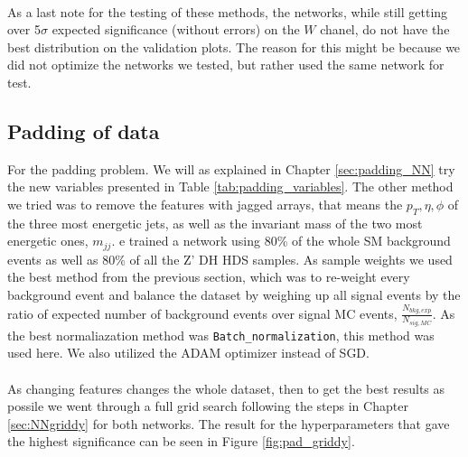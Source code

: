 \documentclass[12pt, a4paper]{book}
\begin{document}
\\As a last note for the testing of these methods, the networks, while still getting over 5$\sigma$ expected significance (without errors) on the $W$ chanel, do not have the best distribution on the validation plots. The reason for this might be because 
we did not optimize the networks we tested, but rather used the same network for test. 
\clearpage


\subsection{Padding of data}\label{sec:padding_NN_res}
For the padding problem. We will as explained in Chapter \ref{sec:padding_NN} try the new variables presented in Table \ref{tab:padding_variables}. The other method we tried was to remove the features with jagged arrays, that means the $p_T, \eta, \phi$ of the three most energetic jets, as well as the invariant mass of the two most energetic ones, $m_{jj}$.
e trained a network using 80\% of the whole SM background events as well as 80\% of all the Z' DH HDS samples. As sample weights we used the best method from the previous section, which was to re-weight every background event and balance the dataset by weighing up all signal events by the ratio of expected number of background events over signal MC events, $\frac{N_{bkg,exp}}{N_{sig,MC}}$. 
As the best normaliazation method was \verb|Batch_normalization|, this method was used here. We also utilized the ADAM optimizer instead of SGD.\\
\\As changing features changes the whole dataset, then to get the best results as possile we went through a full grid search following the steps in Chapter \ref{sec:NNgriddy} for both networks. The result for the hyperparameters that gave the highest significance can be seen in Figure \ref{fig:pad_griddy}.
\graphicspath{{../../../Plots/NeuralNetwork/Padding/}}
\end{document}
